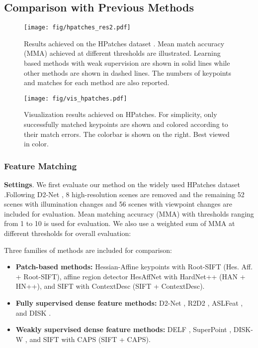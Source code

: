 \documentclass[10pt,twocolumn,letterpaper]{article}
\begin{document}
\subsection{Comparison with Previous Methods}
\begin{figure*}[!t]
    \centering
    \texttt{[image: fig/hpatches\_res2.pdf]}
    \caption{Results achieved on the HPatches dataset \cite{hpatches_2017_cvpr}. Mean match accuracy (MMA) achieved at different thresholds are illustrated. Learning based methods with weak supervision are shown in solid lines while other methods are shown in dashed lines. The numbers of keypoints and matches for each method are also reported.}
    \label{fig-reshpatches}
\end{figure*}

\begin{figure*}[!t]
    \centering
    \texttt{[image: fig/vis\_hpatches.pdf]}
    \caption{Visualization results achieved on HPatches. For simplicity,  only successfully matched keypoints are shown and colored according to their match errors. The colorbar is shown on the right. Best viewed in color.}
    \label{fig_vishpatches}
\end{figure*}

\subsubsection{Feature Matching}
\textbf{Settings}. We first evaluate our method on the widely used HPatches dataset \cite{hpatches_2017_cvpr}.Following D2-Net \cite{Dusmanu2019CVPR}, 8 high-resolution scenes are removed and the remaining 52 scenes with illumination changes and 56 scenes with viewpoint changes are included for evaluation. Mean matching accuracy (MMA) \cite{Dusmanu2019CVPR} with thresholds ranging from 1 to 10 is used for evaluation. 
We also use a weighted sum of MMA at different thresholds for overall evaluation:




{Three families of methods are included for comparison:}
\begin{itemize}
    \item \textbf{{Patch-based methods:}} Hessian-Affine keypoints \cite{mikolajczyk2004scale} with Root-SIFT \cite{arandjelovic2012three} (Hes. Aff. + Root-SIFT), affine region detector HesAffNet \cite{mishkin2018repeatability} with HardNet++ \cite{NIPS2017_831caa1b} (HAN + HN++), and SIFT \cite{lowe2004distinctive} with ContextDesc \cite{luo2019contextdesc} (SIFT + ContextDesc).

    \item { \textbf{Fully supervised dense feature methods:}} D2-Net \cite{Dusmanu2019CVPR}, R2D2 \cite{revaud2019r2d2}, ASLFeat \cite{luo2020aslfeat}, and DISK \cite{tyszkiewiczDISKLearningLocal2020a}. 

    \item { \textbf{Weakly supervised dense feature methods:}} DELF \cite{noh2017large}, SuperPoint \cite{detone2018superpoint}, DISK-W \cite{tyszkiewiczDISKLearningLocal2020a}, 
    and SIFT with CAPS \cite{wangLearningFeatureDescriptors2020} (SIFT + CAPS).
\end{itemize}
\end{document}
